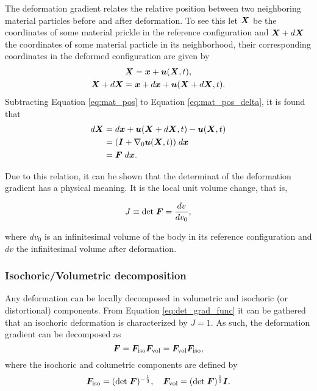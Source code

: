 The deformation gradient relates the relative position between two neighboring material particles before and after deformation.
To see this let $\bm{X}$ be the coordinates of some material prickle in the reference configuration and $\bm{X} + d\bm{X}$ the coordinates of some material particle in its neighborhood, their corresponding coordinates in the deformed configuration are given by
\begin{gather}
    \bm{X} = \bm{x} + \bm{u}(\bm{X}, t), \label{eq:mat_pos}\\
    \bm{X} + d\bm{X} = \bm{x} + d\bm{x} +\bm{u}(\bm{X} +d\bm{X}, t). \label{eq:mat_pos_delta}
\end{gather}
Subtracting Equation \eqref{eq:mat_pos} to Equation \eqref{eq:mat_pos_delta}, it is found that
\begin{align}
    d\bm{X} &= d\bm{x} +\bm{u}(\bm{X} +d\bm{X}, t) -\bm{u}(\bm{X}, t)\\
             &=(\bm{I} +\nabla_0 \bm{u}(\bm{X}, t))\; d\bm{x}\\
             &=\bm{F}\;d\bm{x}.
\end{align}

Due to this relation, it can be shown that the determinat of the deformation gradient has a physical meaning.
It is the local unit volume change, that is,
\begin{highlight}
\begin{equation}
   J\equiv \text{det}\;\bm{F} = \frac{dv}{dv_0}, \label{eq:det_grad_func}
\end{equation}
\end{highlight}
where $dv_0$ is an infinitesimal volume of the body in its reference configuration and $dv$ the infinitesimal volume after deformation.

\subsubsection{Isochoric/Volumetric decomposition}

Any deformation can be locally decomposed in volumetric and isochoric (or distortional) components.
From Equation \eqref{eq:det_grad_func} it can be gathered that an isochoric deformation is characterized by $J=1$.
As such, the deformation gradient can be decomposed as
\begin{equation}
    \bm{F} = \bm{F}_\text{iso} \bm{F}_\text{vol} = \bm{F}_\text{vol} \bm{F}_\text{iso},
\end{equation}
where the isochoric and columetric components are defined by
\begin{equation}
    \bm{F}_\text{iso} = (\text{det}\;\bm{F})^{-\frac{1}{3}},\quad \bm{F}_\text{vol} = (\text{det}\;\bm{F})^{\frac{1}{3}}\bm{I}.
\end{equation}

